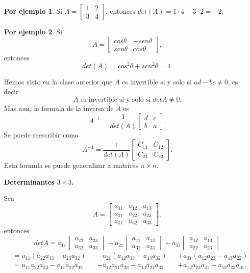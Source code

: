 \documentclass{article}
\theoremstyle{definition}
\theoremstyle{definition}
\newtheorem*{ej}{Por ejemplo}
\theoremstyle{remark}
\begin{document}
\begin{ej}
  Si $A=\begin{bmatrix}1 & 2 \\ 3 & 4 \end{bmatrix}$, entonces $det(A)=1 \cdot 4 - 3 \cdot 2 = -2$.
\end{ej}
\begin{ej}
  Si \[
    A=\begin{bmatrix}cos\theta & -sen\theta \\ sen\theta & cos\theta \end{bmatrix},
  \]
  entonces \[
det(A)=cos^2\theta+sen^2\theta=1.
  \]
  \pagebreak

  Hemos visto en la clase anterior que $A$ es invertible si y solo si $ad-bc \neq 0$, es decir \[
    A \text{ es invertible si y solo si } detA \neq 0.
  \]
  Mas aun, la formula de la inversa de $A$ es \[
    A^{-1} = \frac{1}{det(A)} \begin{bmatrix}d & c \\ b & a \end{bmatrix}.
  \]
  Se puede reescribir como \[
    A^{-1}=\frac{1}{det(A)}\begin{bmatrix}C_{11} & C_{12} \\ C_{21} & C_{22} \end{bmatrix}.
  \]
  Esta formula se puede generalizar a matrices $ n \times n$.
\end{ej}
\begin{center}
\textbf{Determinantes $3 \times 3$.}
\end{center}
Sea \[
  A=\begin{bmatrix}a_{11} & a_{12} & a_{13} \\ a_{21} & a_{22} & a_{23} \\ a_{31} & a_{32} & a_{33} \end{bmatrix},
\]
entonces
\[
  detA=a_{11}\begin{vmatrix}a_{22}&a_{23} \\ a_{32}&a_{33} \end{vmatrix}-a_{21}\begin{vmatrix}a_{12} & a_{13} \\ a_{32} & a_{33} \end{vmatrix} + a_{31} \begin{vmatrix}a_{12} & a_{13} \\ a_{22} & a_{23} \end{vmatrix}
\]
\[
  \begin{aligned}
    &= a_{11}(a_{22}a_{33}-a_{23}a_{32})&&-a_{21}(a_{12}a_{33}-a_{13}a_{32})&&+a_{31}(a_{12}a_{23}-a_{13}a_{22})\\
    &=a_{11}a_{22}a_{33}-a_{11}a_{22}a_{32}&&-a_{12}a_{21}a_{33}+a_{13}a_{21}a_{32}&&+a_{12}a_{23}a_{31}-a_{13}a_{22}a_{31}.
    \end{aligned}
\]
\end{document}
